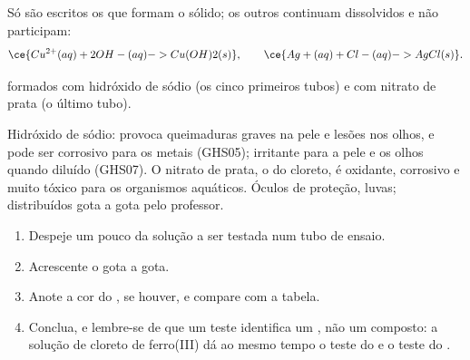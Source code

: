 \begin{example}\label{ex:g9:ions:equation}
Só são escritos os  que formam o sólido; os outros continuam
dissolvidos e não participam:
\[
  \ce{Cu^{2+}(aq) + 2OH-(aq) -> Cu(OH)2(s)}, \qquad
  \ce{Ag+(aq) + Cl-(aq) -> AgCl(s)}.
\]
\end{example}
\begin{omfigure}

{\small {} formados com hidróxido de sódio (os cinco primeiros
tubos) e com nitrato de prata (o último tubo).}
\end{omfigure}

\begin{safety}{}
Hidróxido de sódio: provoca queimaduras graves na pele e lesões nos
olhos, e pode ser corrosivo para os metais (GHS05); irritante para a
pele e os olhos quando diluído (GHS07). O nitrato de prata, o 
do cloreto, é oxidante, corrosivo e muito tóxico para os organismos
aquáticos. Óculos de proteção, luvas;  distribuídos gota a gota
pelo professor.
\end{safety}

\begin{method}\label{met:g9:ions:test}
\begin{enumerate}
  \item Despeje um pouco da solução a ser testada num tubo de ensaio.
  \item Acrescente o  gota a gota.
  \item Anote a cor do , se houver, e compare com a tabela.
  \item Conclua, e lembre-se de que um teste identifica um , não um
        composto: a solução de cloreto de ferro(III) dá ao mesmo tempo o
        teste do  e o teste do .
\end{enumerate}
\end{method}

